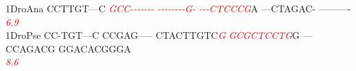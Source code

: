 \documentclass[11pt,twoside,reqno,a4paper]{article}
\begin{document}
{1\hspace*{3\charwidth}DroAna	CCTTGT---C	\textit{\textcolor{red}{G}}\textit{\textcolor{red}{C}}\textit{\textcolor{red}{C}}\textit{\textcolor{red}{-}}\textit{\textcolor{red}{-}}\textit{\textcolor{red}{-}}\textit{\textcolor{red}{-}}\textit{\textcolor{red}{-}}\textit{\textcolor{red}{-}}\textit{\textcolor{red}{-}}	\textit{\textcolor{red}{-}}\textit{\textcolor{red}{-}}\textit{\textcolor{red}{-}}\textit{\textcolor{red}{-}}\textit{\textcolor{red}{-}}\textit{\textcolor{red}{-}}\textit{\textcolor{red}{-}}\textit{\textcolor{red}{-}}\textit{\textcolor{red}{G}}\textit{\textcolor{red}{-}}	\textit{\textcolor{red}{-}}\textit{\textcolor{red}{-}}\textit{\textcolor{red}{-}}\textit{\textcolor{red}{C}}\textit{\textcolor{red}{T}}\textit{\textcolor{red}{C}}\textit{\textcolor{red}{C}}\textit{\textcolor{red}{C}}\textit{\textcolor{red}{G}}A	---CTAGAC-	----------	\\
\hspace*{4\charwidth}\hspace*{7\charwidth}\hspace*{1\charwidth}\hspace*{10\charwidth}\textit{\textcolor{red}{6.9}}\hspace*{1\charwidth}\hspace*{1\charwidth}\hspace*{1\charwidth}\hspace*{1\charwidth}\hspace*{1\charwidth}\\
1\hspace*{3\charwidth}DroPse	CC-TGT---C	CCGAG-----	CTACTTGTC\textit{\textcolor{red}{G}}	\textit{\textcolor{red}{G}}\textit{\textcolor{red}{C}}\textit{\textcolor{red}{G}}\textit{\textcolor{red}{C}}\textit{\textcolor{red}{T}}\textit{\textcolor{red}{C}}\textit{\textcolor{red}{C}}\textit{\textcolor{red}{T}}\textit{\textcolor{red}{G}}G	---CCAGACG	GGACACGGGA	\\
\hspace*{4\charwidth}\hspace*{7\charwidth}\hspace*{1\charwidth}\hspace*{1\charwidth}\hspace*{29\charwidth}\textit{\textcolor{red}{8.6}}\hspace*{1\charwidth}\hspace*{1\charwidth}\hspace*{1\charwidth}\hspace*{1\charwidth}\\
}
\end{document}
